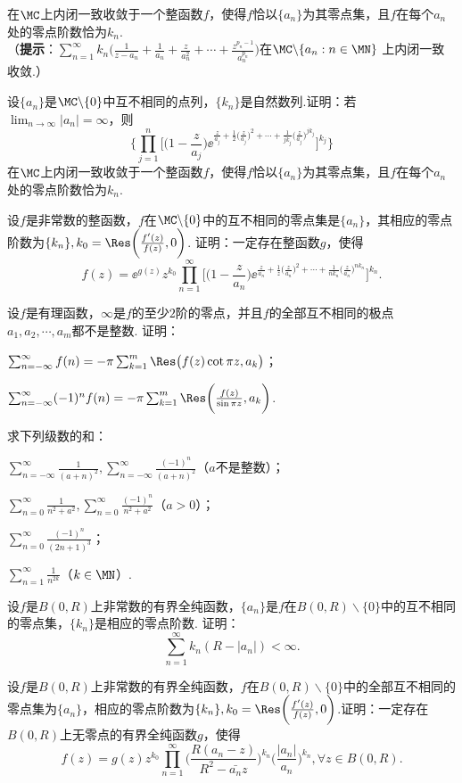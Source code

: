 \begin{xiti}
在$\MC$上内闭一致收敛于一个整函数$f$，使得$f$恰以$\{a_n\}$为其零点集，且$f$在每个$a_n$处的零点阶数恰为$k_n$.\\
（\textbf{提示}：$\sum_{n=1}^\infty k_n\bigg(\frac1{z-a_n}+\frac1{a_n}
+\frac z{a_n^2}+\cdots+\frac{z^{p_n-1}}{a_n^{p_n}}\bigg)$在$\MC\backslash\{a_n:n\in\MN\}$
上内闭一致收敛.）
\item 设$\{a_n\}$是$\MC\backslash\{0\}$中互不相同的点列，$\{k_n\}$是自然数列.证明：若$\lim_{n\to\infty}|a_n|=\infty$，则
\[\bigg\{\prod_{j=1}^n\bigg[\bigg(1-\frac z{a_j}\bigg)\ee^{\frac z{a_j}+\frac12\big(\frac z{a_j}\big)^2+\cdots+\frac1{jk_j}\big(\frac z{a_j}\big)^{jk_j}}\bigg]^{k_j}\bigg\}\]
在$\MC$上内闭一致收敛于一个整函数$f$，使得$f$恰以$\{a_n\}$为其零点集，且$f$在每个$a_n$处的零点阶数恰为$k_n$.
\item 设$f$是非常数的整函数，$f$在$\MC\backslash\{0\}$中的互不相同的零点集是$\{a_n\}$，其相应的零点阶数为$\{k_n\},k_0=\Res\bigg(\frac{f'(z)}{f(z)},0\bigg)$. 证明：一定存在整函数$g$，使得
    \[f(z)=\ee^{g(z)}z^{k_0}\prod_{n=1}^\infty\bigg[\bigg(1-\frac z{a_n}\bigg)\ee^{\frac z{a_n}+\frac1z\big(\frac z{a_n}\big)^2
    +\cdots+\frac1{nk_n}\big(\frac z{a_n}\big)^{nk_n}}\bigg]^{k_n}.\]
\item 设$f$是有理函数，$\infty$是$f$的至少$2$阶的零点，并且$f$的全部互不相同的极点$a_1,a_2,\cdots,a_m$都不是整数. 证明：
\begin{enuma}
  \item $\sum_{n=-\infty}^\infty f(n)=-\pi\sum_{k=1}^m\Res\big(f(z)\cot\pi z,a_k\big)$；
  \item $\sum_{n=-\infty}^\infty (-1)^nf(n)=-\pi\sum_{k=1}^m\Res\bigg(\frac{f(z)}{\sin\pi z},a_k\bigg)$.
\end{enuma}
\item 求下列级数的和：
\begin{enuma}
  \item $\sum_{n=-\infty}^\infty\frac1{(a+n)^2},\sum_{n=-\infty}^\infty
      \frac{(-1)^n}{(a+n)^2}$（$a$不是整数）；
  \item $\sum_{n=0}^\infty\frac1{n^2+a^2},\sum_{n=0}^\infty\frac{(-1)^n}{n^2+a^2}$（$a>0$）；
  \item $\sum_{n=0}^\infty\frac{(-1)^n}{(2n+1)^3}$；
  \item $\sum_{n=1}^\infty\frac1{n^{2k}}$（$k\in\MN$）.
\end{enuma}
\item 设$f$是$B(0,R)$上非常数的有界全纯函数，$\{a_n\}$是$f$在$B(0,R)\backslash\{0\}$中的互不相同的零点集，$\{k_n\}$是相应的零点阶数. 证明：
    \[\sum_{n=1}^\infty k_n(R-|a_n|)<\infty.\]
\item 设$f$是$B(0,R)$上非常数的有界全纯函数，$f$在$B(0,R)\backslash\{0\}$中的全部互不相同的零点集为$\{a_n\}$，相应的零点阶数为$\{k_n\},k_0=\Res\bigg(\frac{f'(z)}{f(z)},0\bigg)$.证明：一定存在$B(0,R)$上无零点的有界全纯函数$g$，使得
\[f(z)=g(z)z^{k_0}\prod_{n=1}^\infty\bigg(\frac{R(a_n-z)}{R^2-\bar {a_n}z}\bigg)^{k_n}
\bigg(\frac{|a_n|}{a_n}\bigg)^{k_n},\forall z\in B(0,R).\]
\end{xiti}
